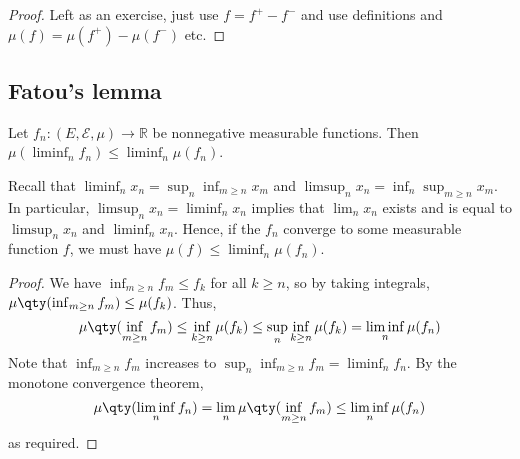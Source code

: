 \begin{proof}
	Left as an exercise, just use $f = f^+ - f^-$ and use definitions and $\mu(f) = \mu(f^+) - \mu(f^-)$ etc.
\end{proof}

\subsection{Fatou's lemma}
\begin{lemma}
	Let $f_n \colon (E, \mathcal E, \mu) \to \mathbb R$ be nonnegative measurable functions.
	Then $\mu (\liminf_n f_n) \leq \liminf_n \mu(f_n)$.
\end{lemma}
\begin{remark}
	Recall that $\liminf_n x_n = \sup_n \inf_{m \geq n} x_m$ and $\limsup_n x_n = \inf_n \sup_{m \geq n} x_m$.
	In particular, $\limsup_n x_n = \liminf_n x_n$ implies that $\lim_n x_n$ exists and is equal to $\limsup_n x_n$ and $\liminf_n x_n$.
	Hence, if the $f_n$ converge to some measurable function $f$, we must have $\mu(f) \leq \liminf_n \mu(f_n)$.
\end{remark}
\begin{proof}
	We have $\inf_{m \geq n} f_m \leq f_k$ for all $k \geq n$, so by taking integrals, $\mu\qty(\inf_{m \geq n} f_m) \leq \mu(f_k)$.
	Thus,
	\[ \mu\qty(\inf_{m \geq n} f_m) \leq \inf_{k \geq n} \mu(f_k) \leq \sup_n \inf_{k \geq n} \mu(f_k) = \liminf_n \mu(f_n) \]
	Note that $\inf_{m \geq n} f_m$ increases to $\sup_n \inf_{m \geq n} f_m = \liminf_n f_n$.
	By the monotone convergence theorem,
	\[ \mu\qty(\liminf_n f_n) = \lim_n \mu\qty(\inf_{m \geq n} f_m) \leq \liminf_n \mu(f_n) \]
	as required.
\end{proof}

